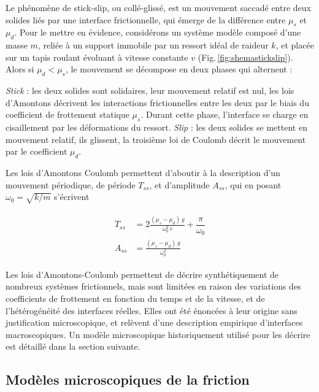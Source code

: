 Le phénomène de stick-slip, ou collé-glissé, est un mouvement saccadé entre deux solides liés par une interface frictionnelle, qui émerge de la différence entre $\mu_s$ et $\mu_d$.
Pour le mettre en évidence, considérons un système modèle composé d'une masse $m$, reliée à un support immobile par un ressort idéal de raideur $k$, et placée sur un tapis roulant évoluant à vitesse constante $v$ (Fig.\,\ref{fig:shemastickslip}). Alors si $\mu_d<\mu_s$, le mouvement se décompose en deux phases qui alternent :

\begin{itemize}
\bitem \textit{Stick} : les deux solides sont solidaires, leur mouvement relatif est nul, les lois d'Amontons décrivent les interactions frictionnelles entre les deux par le biais du coefficient de frottement statique $\mu_s$. Durant cette phase, l'interface se charge en cisaillement par les déformations du ressort.
\bitem \textit{Slip} : les deux solides se mettent en mouvement relatif, ils glissent, la troisième loi de Coulomb décrit le mouvement par le coefficient $\mu_d$.
\end{itemize}


Les lois d'Amontons Coulomb permettent d'aboutir à la description d'un mouvement périodique, de période $T_{ss}$,  et d'amplitude $A_{ss}$, qui en posant $\omega_0 = \sqrt{{k}/{m}}$ s'écrivent


\begin{align}[left=\empheqlbrace]
	\begin{split}
		T_{ss} &= 2\frac{(\mu_s-\mu_d) \,g}{\omega_0^2\,v} + \dfrac{\pi}{\omega_0}\\
		A_{ss} &= \frac{(\mu_s-\mu_d)\,g}{\omega_0 ^2}
	\end{split}
\label{eq:freqss}
\end{align}



Les lois d'Amontons-Coulomb permettent de décrire synthétiquement de nombreux systèmes frictionnels, mais sont limitées en raison des variations des coefficients de frottement en fonction du temps et de la vitesse, et de l'hétérogénéité des interfaces réelles. Elles ont été énoncées à leur origine sans justification microscopique, et relèvent d'une description empirique d'interfaces macroscopiques. Un modèle microscopique historiquement utilisé pour les décrire est détaillé dans la section suivante.



\subsection{Modèles microscopiques de la friction}

